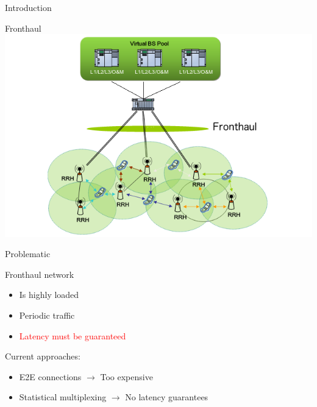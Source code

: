 \documentclass[10 pt]{beamer}
\begin{document}
\begin{section}{Introduction}
\begin{frame}{Fronthaul}
  \centering
  \includegraphics[scale=0.5]{CRAN}\\
  
\end{frame}

\begin{frame}{Problematic}
  \centering
  
  
 \begin{multicols}{2}
Fronthaul network 
\begin{itemize}
\item Is highly loaded
\item Periodic traffic
\item \textcolor{red}{Latency must be guaranteed}
\end{itemize}
\vspace{0.5cm}
Current approaches: \begin{itemize}
\item E2E connections $\rightarrow$ Too expensive
\item Statistical multiplexing $\rightarrow$ No latency guarantees  
\end{itemize}
\end{multicols}

\end{frame}

\end{section}
\end{document}

